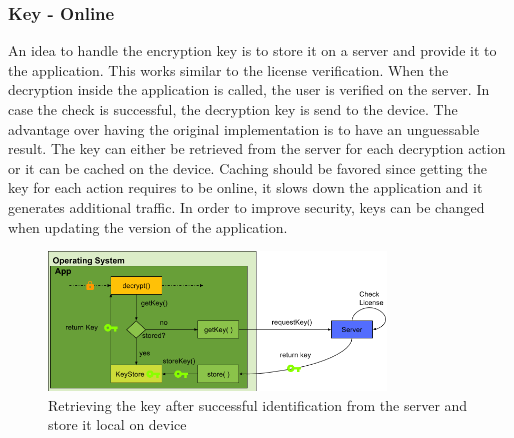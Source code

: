 \subsubsection{Key - Online} \label{section:counter-replace-encryption-key-online}
An idea to handle the encryption key is to store it on a server and provide it to the application.
This works similar to the license verification.
When the decryption inside the application is called, the user is verified on the server.
In case the check is successful, the decryption key is send to the device.
The advantage over having the original implementation is to have an unguessable result.
The key can either be retrieved from the server for each decryption action or it can be cached on the device.
Caching should be favored since getting the key for each action requires to be online, it slows down the application and it generates additional traffic.
In order to improve security, keys can be changed when updating the version of the application.
\begin{figure}[h]
    \centering
    \includegraphics[width=0.8\textwidth]{data/encryptionKeyServer.png}
    \caption{Retrieving the key after successful identification from the server and store it local on device}
    \label{fig:encryptionKeyServer}
\end{figure}

